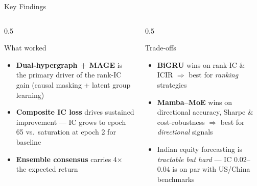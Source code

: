 \documentclass[aspectratio=169, 10pt]{beamer}
\begin{document}
\begin{frame}{Key Findings}
  \begin{columns}[T]
    \begin{column}{0.5\textwidth}
      \begin{block}{What worked}
        \begin{itemize}\setlength{\itemsep}{3pt}
          \item \textbf{Dual-hypergraph + MAGE} is the primary driver of the
                rank-IC gain (causal masking + latent group learning)
          \item \textbf{Composite IC loss} drives sustained improvement —
                IC grows to epoch 65 vs.\ saturation at epoch 2 for baseline
          \item \textbf{Ensemble consensus} carries 4$\times$ the expected return
        \end{itemize}
      \end{block}
    \end{column}
    \begin{column}{0.5\textwidth}
      \begin{block}{Trade-offs}
        \begin{itemize}\setlength{\itemsep}{3pt}
          \item \textbf{BiGRU} wins on rank-IC \& ICIR $\Rightarrow$ best for
                \emph{ranking} strategies
          \item \textbf{Mamba--MoE} wins on directional accuracy, Sharpe \&
                cost-robustness $\Rightarrow$ best for \emph{directional} signals
          \item Indian equity forecasting is \emph{tractable but hard} —
                IC $0.02$--$0.04$ is on par with US/China benchmarks
        \end{itemize}
      \end{block}
    \end{column}
  \end{columns}
\end{frame}
\end{document}
